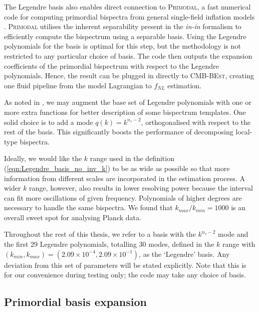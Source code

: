 The Legendre basis also enables direct connection to \textsc{Primodal}, a fast numerical code for computing primordial bispectra from general single-field inflation models \cite{Clarke2021}. \textsc{Primodal} utilises the inherent separability present in the \textit{in-in} formalism to efficiently compute the bispectrum using a separable basis. Using the Legendre polynomials for the basis is optimal for this step, but the methodology is not restricted to any particular choice of basis. The code then outputs the expansion coefficients of the primordial bispectrum with respect to the Legendre polynomials. Hence, the result can be plugged in directly to \textsc{CMB-BEst}, creating one fluid pipeline from the model Lagrangian to $f_{NL}$ estimation.

As noted in \cite{Clarke2021}, we may augment the base set of Legendre polynomials with one or more extra functions for better description of some bispectrum templates. One solid choice is to add a mode $q(k) = k^{n_s -2}$, orthogonalised with respect to the rest of the basis. This significantly boosts the performance of decomposing local-type bispectra.

Ideally, we would like the $k$ range used in the definition (\ref{eqn:Legendre_basis_no_inv_k}) to be as wide as possible so that more information from different scales are incorporated in the estimation process. A wider $k$ range, however, also results in lower resolving power because the interval can fit more oscillations of given frequency. Polynomials of higher degrees are necessary to handle the same bispectra. We found that $k_{max}/k_{min} = 1000$ is an overall sweet spot for analysing Planck data.

Throughout the rest of this thesis, we refer to a basis with the $k^{n_s - 2}$ mode and the first 29 Legendre polynomials, totalling 30 modes, defined in the $k$ range with $(k_{min}, k_{max}) = (2.09 \times 10^{-4}, 2.09 \times 10^{-1})$, as the `Legendre' basis. Any deviation from this set of parameters will be stated explicitly. Note that this is for our convenience during testing only; the code may take any choice of basis.


\subsection{Primordial basis expansion} \label{section:primordial_basis_expansion}


